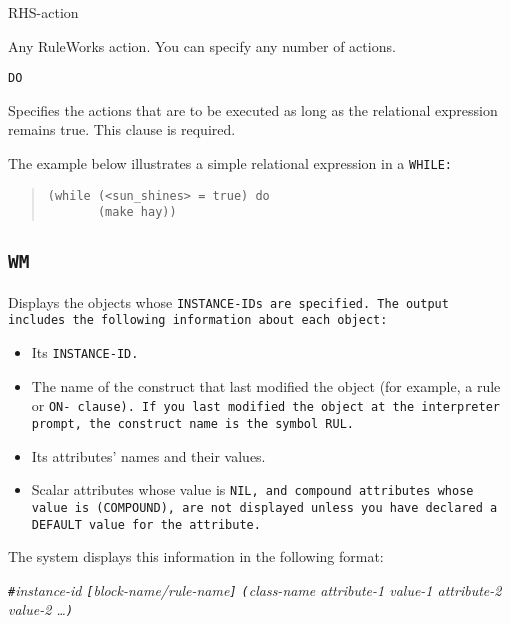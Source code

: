 {{\begin{arguments}
\item[RHS-action]

  Any RuleWorks action. You can specify any number of actions.
\end{arguments}

\Clause

\tt{DO}

Specifies the actions that are to be executed as long as the
relational expression remains true. This clause is required.

\Example

The example below illustrates a simple relational expression in a
\tt{WHILE}:

\begin{quote}
\begin{verbatim}
(while (<sun_shines> = true) do
       (make hay))
\end{verbatim}
\end{quote}
     
\subsection{\tt{WM}}

Displays the objects whose \tt{INSTANCE-ID}s are specified. The output
includes the following information about each object:

\begin{itemize}
\item Its \tt{INSTANCE-ID}.

\item The name of the construct that last modified the object (for
  example, a rule or \tt{ON-} clause). If you last modified the object
  at the interpreter prompt, the construct name is the symbol \tt{RUL}.

\item Its attributes' names and their values.

\item Scalar attributes whose value is \tt{NIL}, and compound attributes
  whose value is \tt{(COMPOUND)}, are not displayed unless you have
  declared a \tt{DEFAULT} value for the attribute.
\end{itemize}

The system displays this information in the following format:

\verb|#|\it{instance-id} \verb|[|\it{block-name/rule-name}\verb|]| \verb|(|\it{class-name} \it{attribute-1} \it{value-1} \it{attribute-2} \it{value-2} \ldots\verb|)|

}}
